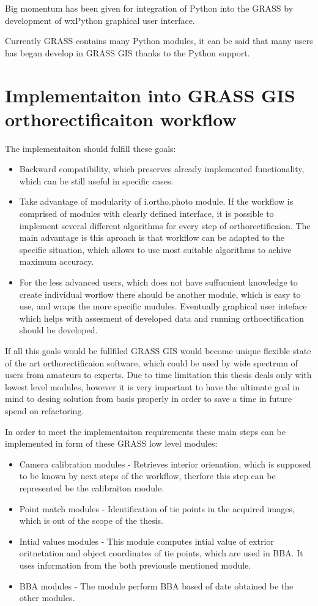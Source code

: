 \documentclass[a4paper,12pt]{report}
\begin{document}
Big momentum has been given for integration of Python into the GRASS by development of wxPython graphical
user interface. 

Currently GRASS contains many Python modules, it can be said that many users has began develop in GRASS GIS
thanks to the Python support. 

\section{Implementaiton into GRASS GIS orthorectificaiton workflow}

The implementaiton should fulfill these goals:

\begin{itemize}
\item Backward compatibility, which preserves already implemented functionality, which
can be still useful in specific cases. 
\item Take advantage of modularity of i.ortho.photo module.
If the workflow is comprised of modules with clearly defined interface, it is possible to implement
several different algorithms for every step of orthorectificaion. The main advantage is this 
aproach is that workflow can be adapted to the specific situation, which allows to use 
most suitable algorithms to achive maximum accuracy.
\item For the less advanced users, which does not have suffucuient knowledge to create individual 
worflow there should be another module, which is easy to use, and wraps the more specific mudules.
Eventually graphical user inteface which helps with assesment of developed data and running orthoectification
should be developed. 
\end{itemize}

If all this goals would be fullfiled GRASS GIS would become unique flexible state of the art orthorectificaion 
software, which could be used by wide spectrum of users from amateurs to experts.
Due to time limitation this thesis deals only with lowest level modules, however it is very important to have 
the ultimate goal in mind to desing solution from basis properly in order to save a time in future spend 
on refactoring.

In order to meet the implementaiton requirements these main steps can be implemented in form 
of these GRASS low level modules:

\begin{itemize}
\item Camera calibration modules - Retrieves interior orienation, which is supposed to be known by 
next steps of the workflow, therfore this step can be represented be the calibraiton module.
\item Point match modules - Identification of tie points in the acquired images, which is out of the 
scope of the thesis.
\item Intial values modules - This module computes intial value of extrior oritnetation and 
object coordinates of tie points, which are used in BBA. It uses information from the both
previousle mentioned module.
\item BBA modules - The module perform BBA based of date obtained be the other modules.
\end{itemize}
\end{document}
